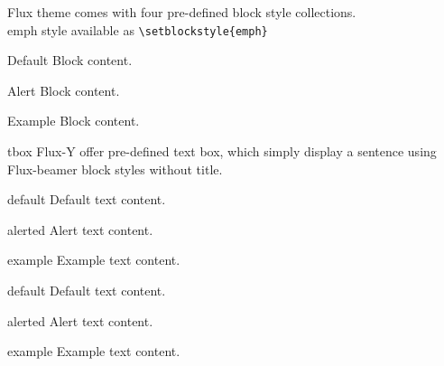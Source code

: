 \documentclass[9pt,aspectratio=169]{ctexbeamer}
\begin{document}
\begin{frame}[fragile]{\secname}{\subsecname}
  Flux theme comes with four pre-defined block style collections.\\
  emph style available as \verb+\setblockstyle{emph}+\\[0.5cm]

\centering
\begin{minipage}[b]{0.45\textwidth}

\begin{block}{Default}
    Block content.
  \end{block}

  \begin{alertblock}{Alert}
    Block content.
  \end{alertblock}

  \begin{exampleblock}{Example}
    Block content.
  \end{exampleblock}      
  
\end{minipage}

\end{frame}

\begin{frame}[fragile]{\secname}{tbox}
  Flux-Y offer pre-defined text box, which simply display a sentence using Flux-beamer block styles without title.\\[0.5cm]
\centering
\begin{minipage}[b]{0.25\textwidth}
  \begin{tbox}{default}
    Default text content.
  \end{tbox}

  \begin{tbox}{alerted}
    Alert text content.
  \end{tbox}

  \begin{tbox}{example}
    Example text content.
  \end{tbox}      
  
\end{minipage}
\hspace{1cm}
\begin{minipage}[b]{0.25\textwidth}
  \begin{tbox}{default}
    Default text content.
  \end{tbox}

  \begin{tbox}{alerted}
    Alert text content.
  \end{tbox}

  \begin{tbox}{example}
    Example text content.
  \end{tbox}      
  
\end{minipage}

\end{frame}
\end{document}
